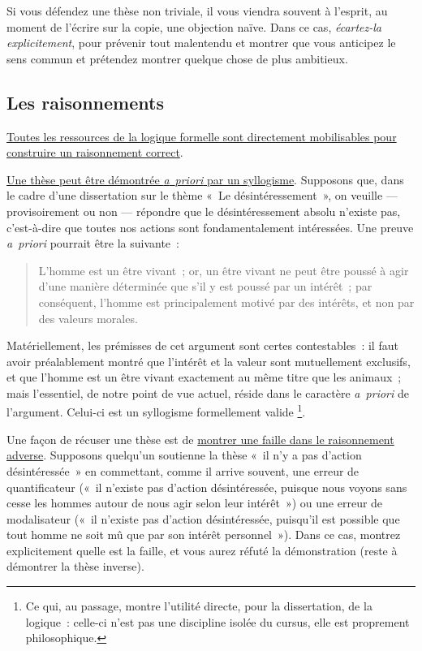 \documentclass[a4paper,12pt]{report}
\begin{document}
Si vous défendez une thèse non triviale, il vous viendra souvent à
l'esprit, au moment de l'écrire sur la copie, une objection naïve. Dans
ce cas, \emph{écartez-la explicitement}, pour prévenir tout malentendu et
montrer que vous anticipez le sens commun et prétendez montrer quelque
chose de plus ambitieux.


\subsection{Les raisonnements}
\label{sec:orgc2183c1}

\uline{Toutes les ressources de la logique formelle sont directement
mobilisables pour construire un raisonnement correct}.

\uline{Une thèse peut être démontrée \emph{a} \emph{priori} par un syllogisme}.
Supposons que, dans le cadre d'une dissertation sur le thème « Le
désintéressement », on veuille --- provisoirement ou non --- répondre
que le désintéressement absolu n'existe pas, c'est-à-dire que toutes nos
actions sont fondamentalement intéressées. Une preuve \emph{a priori}
pourrait être la suivante :
\begin{quote}
L'homme est un être vivant ; or, un être vivant ne peut être poussé à
agir d'une manière déterminée que s'il y est poussé par un intérêt ;
par conséquent, l'homme est principalement motivé par des intérêts, et
non par des valeurs morales.
\end{quote}
Matériellement, les prémisses de cet argument sont certes contestables :
il faut avoir préalablement montré que l'intérêt et la valeur sont
mutuellement exclusifs, et que l'homme est un être vivant exactement au
même titre que les animaux ; mais l'essentiel, de notre point de vue
actuel, réside dans le caractère \emph{a priori} de l'argument. Celui-ci est
un syllogisme formellement valide \footnote{Ce qui, au passage, montre l'utilité directe, pour la dissertation,
de la logique : celle-ci n'est pas une discipline isolée du cursus,
elle est proprement philosophique.}.

Une façon de récuser une thèse est de \uline{montrer une faille dans le
raisonne\-ment adverse}. Supposons quelqu'un soutienne la thèse « il n'y
a pas d'action désintéressée » en commettant, comme il arrive souvent,
une erreur de quantificateur (« il n'existe pas d'action désintéressée,
puisque nous voyons sans cesse les hommes autour de nous agir selon leur
intérêt ») ou une erreur de modalisateur (« il n'existe pas d'action
désintéressée, puisqu'il est possible que tout homme ne soit mû que par
son intérêt personnel »). Dans ce cas, montrez explicitement quelle est
la faille, et vous aurez réfuté la démonstration (reste à démontrer la
thèse inverse).
\end{document}
